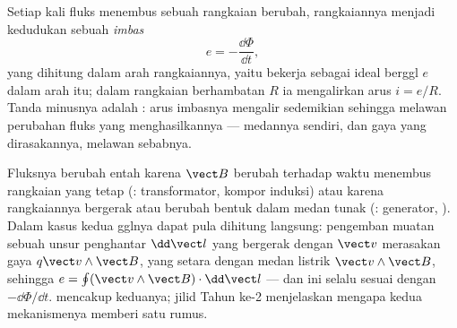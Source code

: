 \begin{theorem}\label{thm:b1:induction:faraday}
Setiap kali fluks menembus sebuah rangkaian berubah, rangkaiannya menjadi kedudukan
sebuah \emph{ imbas}
\[
e = -\frac{\dd\Phi}{\dd t} ,
\]
yang dihitung dalam arah rangkaiannya, yaitu bekerja sebagai  ideal berggl $e$ dalam arah itu; dalam rangkaian berhambatan $R$
ia mengalirkan arus $i = e/R$. Tanda minusnya adalah \emph{}:
arus imbasnya mengalir sedemikian sehingga melawan perubahan fluks yang
menghasilkannya --- medannya sendiri, dan gaya yang dirasakannya, melawan sebabnya.
\end{theorem}
\admitted

\begin{remark}\label{rem:b1:induction:twofaces}
Fluksnya berubah entah karena $\vect B$ berubah terhadap waktu menembus
rangkaian yang tetap (\emph{}: transformator, kompor induksi)
atau karena rangkaiannya bergerak atau berubah bentuk dalam medan tunak
(\emph{}: generator, ). Dalam kasus kedua
gglnya dapat pula dihitung langsung: pengemban muatan sebuah unsur penghantar
$\dd\vect l$ yang bergerak dengan $\vect v$ merasakan gaya $q\vect v\wedge
\vect B$, yang setara dengan medan listrik $\vect v\wedge\vect B$, sehingga
$e = \oint(\vect v\wedge\vect B)\cdot\dd\vect l$ --- dan ini selalu sesuai
dengan $-\dd\Phi/\dd t$.  mencakup keduanya; jilid Tahun ke-2
menjelaskan mengapa kedua mekanismenya memberi satu rumus.
\end{remark}

